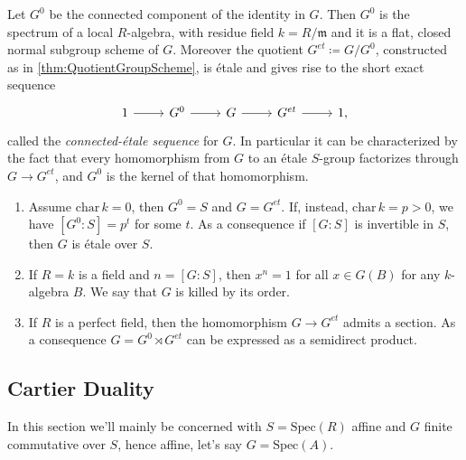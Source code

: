 \begin{thm}\label{thm:ConnectedEtaleSequenceGS}
	Let $G^0$ be the connected component of the identity in $G$.
	Then $G^0$ is the spectrum of a local $R$-algebra, with residue field $k = R/\mathfrak{m}$
	and it is a flat, closed normal subgroup scheme of $G$.
	Moreover the quotient $G^{et} \coloneqq G/G^0$,
	constructed as in \cref{thm:QuotientGroupScheme},
	is étale and gives rise to the short exact sequence
	\begin{equation*}
	\begin{tikzcd}
		1 \arrow[r, "", rightarrow] &
		G^0 \arrow[r, "", rightarrow] &
		G \arrow[r, "", rightarrow] &
		G^{et} \arrow[r, "", rightarrow] &
		1
	,\end{tikzcd}
	\end{equation*}
	called the {\em connected-étale sequence} for $G$.
	In particular it can be characterized by the fact that every homomorphism
	from $G$ to an étale $S$-group factorizes through $G \to G^{et}$,
	and $G^0$ is the kernel of that homomorphism.
\end{thm}


\begin{prop}\label{prop:PropertiesConnectedEtale}
\leavevmode\vspace{-.2\baselineskip}
\begin{enumerate}
	\item Assume $\mathrm{char}\, k = 0$, then $G^0 = S$
		and $G = G^{et}$.
		If, instead, $\mathrm{char}\, k = p > 0$, we have
		$[G^0:S] = p^t$ for some $t$.
		As a consequence if $[G:S]$ is invertible in $S$, then
		$G$ is étale over $S$.

	\item If $R = k$ is a field and $n = [G:S]$, then $x^n = 1$
		for all $x \in G(B)$ for any $k$-algebra $B$.
		We say that $G$ is killed by its order.

	\item If $R$ is a perfect field, then the homomorphism
		$G \to  G^{et}$ admits a section. 
		As a consequence $G = G^0 \rtimes G^{et}$
		can be expressed as a semidirect product.
\end{enumerate}
\end{prop}


\subsection{Cartier Duality}\label{CartierDualityGroups}
In this section we'll mainly be concerned with $S = \mathrm{Spec}(R)$ affine
and $G$ finite commutative over $S$, hence affine, let's say $G = \mathrm{Spec}(A)$.


